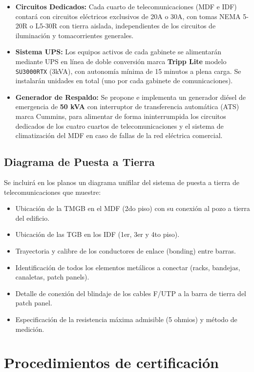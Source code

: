 \begin{itemize}
    \item \textbf{Circuitos Dedicados:} Cada cuarto de telecomunicaciones (MDF e IDF) contará con circuitos eléctricos exclusivos de 20A o 30A, con tomas NEMA 5-20R o L5-30R con tierra aislada, independientes de los circuitos de iluminación y tomacorrientes generales.
    \item \textbf{Sistema UPS:} Los equipos activos de cada gabinete se alimentarán mediante UPS en línea de doble conversión marca \textbf{Tripp Lite} modelo \texttt{SU3000RTX} (3kVA), con autonomía mínima de 15 minutos a plena carga. Se instalarán \totalUPS{} unidades en total (uno por cada gabinete de comunicaciones).
    \item \textbf{Generador de Respaldo:} Se propone e implementa un generador diésel de emergencia de \textbf{50 kVA} con interruptor de transferencia automática (ATS) marca Cummins, para alimentar de forma ininterrumpida los circuitos dedicados de los cuatro cuartos de telecomunicaciones y el sistema de climatización del MDF en caso de fallas de la red eléctrica comercial.
\end{itemize}

\subsection*{Diagrama de Puesta a Tierra}

Se incluirá en los planos un diagrama unifilar del sistema de puesta a tierra de telecomunicaciones que muestre:

\begin{itemize}
    \item Ubicación de la TMGB en el MDF (2do piso) con su conexión al pozo a tierra del edificio.
    \item Ubicación de las TGB en los IDF (1er, 3er y 4to piso).
    \item Trayectoria y calibre de los conductores de enlace (bonding) entre barras.
    \item Identificación de todos los elementos metálicos a conectar (racks, bandejas, canaletas, patch panels).
    \item Detalle de conexión del blindaje de los cables F/UTP a la barra de tierra del patch panel.
    \item Especificación de la resistencia máxima admisible (5 ohmios) y método de medición.
\end{itemize}

\section{Procedimientos de certificación}


